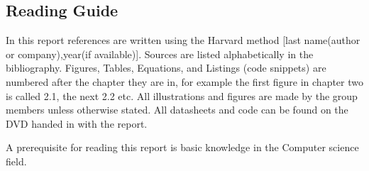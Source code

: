 \subsection*{Reading Guide}
\label{sub:reading_guide}

In this report references are written using the Harvard method [last name(author or company),year(if available)].
Sources are listed alphabetically in the bibliography.
Figures, Tables, Equations, and Listings (code snippets) are numbered after the chapter they are in,
for example the first figure in chapter two is called 2.1, the next 2.2 etc.
All illustrations and figures are made by the group members unless otherwise stated.
All datasheets and code can be found on the DVD handed in with the report.

A prerequisite for reading this report is basic knowledge in the 
Computer science field.

